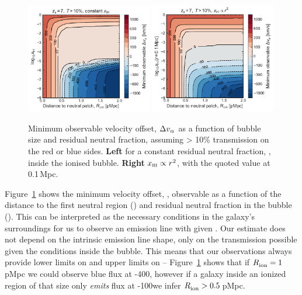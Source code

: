 \documentclass[fleqn,usenatbib]{mnras}
\begin{document}
\begin{figure}
    \includegraphics[width=0.49\textwidth]{figs/fig5a.pdf}
    \includegraphics[width=0.49\textwidth]{figs/fig5b.pdf}
    \caption{Minimum observable \lya velocity offset, $\DV_\alpha$ as a function of bubble size and residual neutral fraction, assuming > 10\% transmission on the red or blue sides. \textbf{Left} for a constant residual neutral fraction, \xHI, inside the ionised bubble. \textbf{Right} $\xHI \propto r^2$, with the quoted value at 0.1\,Mpc.}
    \label{fig:lya_transmission_minDV}
\end{figure}

Figure~\ref{fig:lya_transmission_minDV} shows the minimum \lya velocity offset, \DV, observable as a function of the distance to the first neutral region (\Rion) and residual neutral fraction in the bubble (\xHI). This can be interpreted as the necessary conditions in the galaxy's surroundings for us to observe an emission line with given \DV. Our estimate does not depend on the intrinsic emission line shape, only on the transmission possible given the conditions inside the bubble. This means that our observations always provide lower limits on \Rion and upper limits on \xHI -- Figure~\ref{fig:lya_transmission_minDV} shows that if $\Rion=1$\,pMpc we could observe blue flux at -400\kms, however if a galaxy inside an ionized region of that size only \textit{emits} flux at -100\kms we infer $\Rion > 0.5$\,pMpc.
\end{document}
